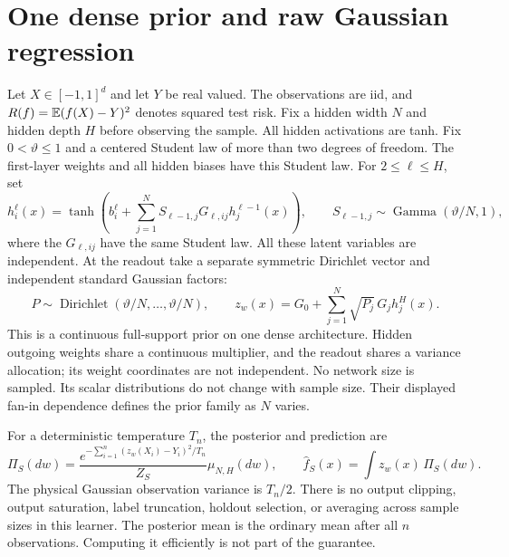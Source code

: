 \section{One dense prior and raw Gaussian regression}
\label{sec:raw-model}
Let $X\in[-1,1]^d$ and let $Y$ be real valued.  The observations are iid,
and $R(f)=\mathbb E(f(X)-Y)^2$ denotes squared test risk.  Fix a hidden width $N$
and hidden depth $H$ before observing the sample.  All hidden activations
are tanh.  Fix $0<\vartheta\le1$ and a centered Student law of more than two
degrees of freedom.  The first-layer weights and all hidden biases have
this Student law.  For $2\le\ell\le H$, set
\[
 h_i^\ell(x)=\tanh\left(b_i^\ell+
             \sum_{j=1}^N S_{\ell-1,j}G_{\ell,ij}h_j^{\ell-1}(x)\right),
 \qquad S_{\ell-1,j}\sim\operatorname{Gamma}(\vartheta/N,1),
\]
where the $G_{\ell,ij}$ have the same Student law.  All these latent
variables are independent.  At the readout take a separate symmetric
Dirichlet vector and independent standard Gaussian factors:
\begin{equation}\label{eq:normalized-raw-prior}
 P\sim\operatorname{Dirichlet}(\vartheta/N,\ldots,\vartheta/N),\qquad
 z_w(x)=G_0+\sum_{j=1}^N\sqrt{P_j}\,G_jh_j^H(x).
\end{equation}
This is a continuous full-support prior on one dense architecture.  Hidden
outgoing weights share a continuous multiplier, and the readout shares a
variance allocation; its weight coordinates are not independent.  No
network size is sampled.  Its scalar distributions do not change with
sample size.  Their displayed fan-in dependence defines the prior family
as $N$ varies.

For a deterministic temperature $T_n$, the posterior and prediction are
\begin{equation}\label{eq:raw-posterior}
 \Pi_S(dw)=\frac{e^{-\sum_{i=1}^n(z_w(X_i)-Y_i)^2/T_n}}{Z_S}\mu_{N,H}(dw),
 \qquad \widehat f_S(x)=\int z_w(x)\,\Pi_S(dw).
\end{equation}
The physical Gaussian observation variance is $T_n/2$.  There is no
output clipping, output saturation, label truncation, holdout selection, or averaging
across sample sizes in this learner.  The posterior mean is the ordinary
mean after all $n$ observations.  Computing it efficiently is not part of
the guarantee.

